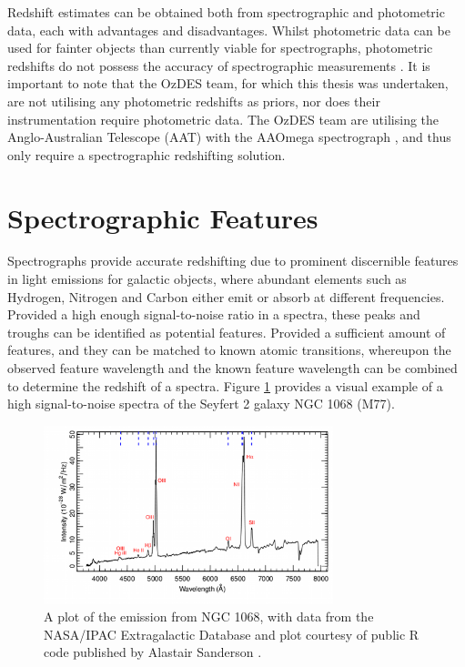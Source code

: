 \documentclass[titlesmallcaps, examinerscopy, copyrightpage]{uqthesis}
\begin{document}
Redshift estimates can be obtained both from spectrographic and photometric data, each with advantages and disadvantages. Whilst photometric data can be used for fainter objects than currently viable for spectrographs, photometric redshifts do not possess the accuracy of spectrographic measurements \cite{bolzonella2000photometric}. It is important to note that the OzDES team, for which this thesis was undertaken, are not utilising any photometric redshifts as priors, nor does their instrumentation require photometric data. The OzDES team are utilising the Anglo-Australian Telescope (AAT) with the AAOmega spectrograph \cite{d2014ozdes}, and thus only require a spectrographic redshifting solution.

\section{Spectrographic Features}

Spectrographs provide accurate redshifting due to prominent discernible features in light emissions for galactic objects, where abundant elements such as Hydrogen, Nitrogen and Carbon either emit or absorb at different frequencies. Provided a high enough signal-to-noise ratio in a spectra, these peaks and troughs can be identified as potential features. Provided a sufficient amount of features, and they can be matched to known atomic transitions, whereupon the observed feature wavelength and the known feature wavelength can be combined to determine the redshift of a spectra. Figure \ref{fig:emission} provides a visual example of a high signal-to-noise spectra of the Seyfert 2 galaxy NGC 1068 (M77).

\begin{figure}[ht!]
\includegraphics[width=0.75\textwidth]{images/M77_opt_spectrum.png} 
\centering
\caption{A plot of the emission from NGC 1068, with data from the NASA/IPAC Extragalactic Database\cite{nasaDB} and plot courtesy of public R code published by Alastair Sanderson \cite{emission}.}
\label{fig:emission}
\end{figure}
\end{document}
